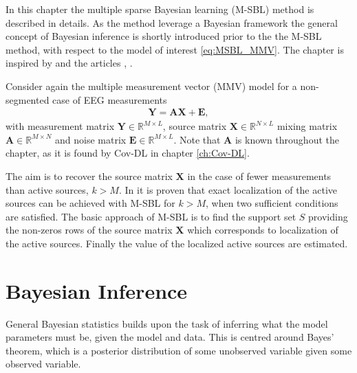 In this chapter the multiple sparse Bayesian learning (M-SBL) method is described in details. As the method leverage a Bayesian framework the general concept of Bayesian inference is shortly introduced prior to the the M-SBL method, with respect to the model of interest \eqref{eq:MSBL_MMV}. The chapter is inspired by \cite{phd_wipf} and the articles \cite{article_wipf}, \cite{Balkan2014}.

Consider again the multiple measurement vector (MMV) model for a non-segmented case of EEG measurements
\begin{align}\label{eq:MSBL_MMV}
\mathbf{Y} = \mathbf{AX} + \mathbf{E},
\end{align}
with measurement matrix $\mathbf{Y} \in \mathbb{R}^{M \times L}$, source matrix $\mathbf{X} \in \mathbb{R}^{N \times L}$ mixing matrix $\mathbf{A} \in \mathbb{R}^{M \times N}$ and noise matrix $\mathbf{E} \in \mathbb{R}^{M \times L}$. Note that $\mathbf{A}$ is known throughout the chapter, as it is found by Cov-DL in chapter \ref{ch:Cov-DL}.

The aim is to recover the source matrix $\mathbf{X}$ in the case of fewer measurements than active sources, $k > M$. 
In \cite{Balkan2014} it is proven that exact localization of the active sources can be achieved with M-SBL for $k > M$, when two sufficient conditions are satisfied.   
The basic approach of M-SBL is to find the support set $S$ providing the non-zeros rows of the source matrix $\mathbf{X}$ which corresponds to localization of the active sources. Finally the value of the localized active sources are estimated.  

\section{Bayesian Inference} 
General Bayesian statistics builds upon the task of inferring what the model parameters must be, given the model and data.  
This is centred around Bayes' theorem, which is a posterior distribution of some unobserved variable given some observed variable.

